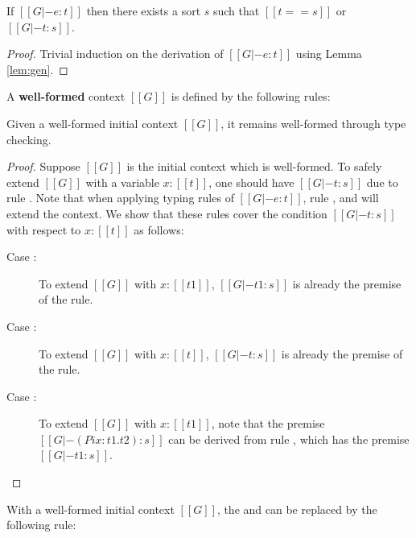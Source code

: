 \begin{lem}\label{lem:corrtyp}
    If $[[G |- e:t]]$ then there exists a sort $s$ such that $[[t == s]]$ or $[[G |- t : s]]$.
\end{lem}

\begin{proof}
    Trivial induction on the derivation of $[[G |- e:t]]$ using Lemma \ref{lem:gen}.
\end{proof}

\begin{dfn}
	A \textbf{well-formed} context $[[G]]$ is defined by the following rules:
	
	\textnormal{\ottdefnctx{}}
\end{dfn}

\begin{lem}\label{lem:wfc}
	Given a well-formed initial context $[[G]]$, it remains well-formed through type checking.
\end{lem}

\begin{proof}
	Suppose $[[G]]$ is the initial context which is well-formed. To safely extend $[[G]]$ with a variable $x:[[t]]$, one should have $[[G |- t:s]]$ due to rule . Note that when applying typing rules of $[[G |- e:t]]$, rule ,  and  will extend the context. We show that these rules cover the condition $[[G |- t:s]]$ with respect to $x:[[t]]$ as follows:
	\begin{description}
		\item[Case :] To extend $[[G]]$ with $x:[[t1]]$, $[[G |- t1:s]]$ is already the premise of the rule.
		\item[Case :] To extend $[[G]]$ with $x:[[t]]$, $[[G |- t:s]]$ is already the premise of the rule.
		\item[Case :] To extend $[[G]]$ with $x:[[t1]]$, note that the premise $[[G |- (Pi x:t1.t2):s]]$ can be derived from rule , which has the premise $[[G |- t1:s]]$.
	\end{description}
\end{proof}

\begin{lem}\label{lem:wfcopt}
	With a well-formed initial context $[[G]]$, the  and  can be replaced by the following rule: \ottusedrule{\ottdruleTXXVarEnv{}}
\end{lem}

